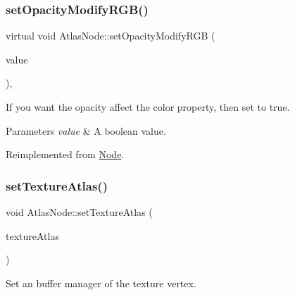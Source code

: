\mbox{\label{classAtlasNode_ab9dacc4ad5e4701ff0a531605f2d1f11}} 
\subsubsection{\texorpdfstring{set\+Opacity\+Modify\+R\+G\+B()}{setOpacityModifyRGB()}\hspace{0.1cm}{\footnotesize\ttfamily [2/2]}}
{\footnotesize\ttfamily virtual void Atlas\+Node\+::set\+Opacity\+Modify\+R\+GB (\begin{DoxyParamCaption}\item[{bool}]{value }\end{DoxyParamCaption})\hspace{0.3cm}{\ttfamily [override]}, {\ttfamily [virtual]}}

If you want the opacity affect the color property, then set to true. 
\begin{DoxyParams}{Parameters}
{\em value} & A boolean value. \\
\hline
\end{DoxyParams}


Reimplemented from \hyperlink{classNode_a978c5435ab23f76e9efdf0f7e9e288e5}{Node}.

\mbox{\label{classAtlasNode_ae008de73e7b0be719b73b57a94722894}} 
\subsubsection{\texorpdfstring{set\+Texture\+Atlas()}{setTextureAtlas()}\hspace{0.1cm}{\footnotesize\ttfamily [1/2]}}
{\footnotesize\ttfamily void Atlas\+Node\+::set\+Texture\+Atlas (\begin{DoxyParamCaption}\item[{\hyperlink{classTextureAtlas}{Texture\+Atlas} $\ast$}]{texture\+Atlas }\end{DoxyParamCaption})}

Set an buffer manager of the texture vertex. \mbox{\label{classAtlasNode_ae008de73e7b0be719b73b57a94722894}} 

